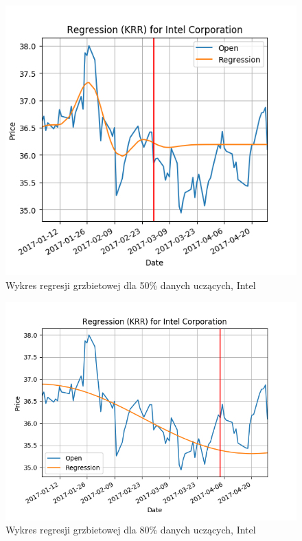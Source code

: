 \begin{figure}[h!]
\centering
\includegraphics[width=150mm]{pictures/plots/intel_krr_50.png}
\caption{Wykres regresji grzbietowej dla 50\% danych uczących, Intel}
\label{fig:Wykres regresji grzbietowej dla 50\% danych uczących, Intel}
\end{figure}

\begin{figure}[h!]
\centering
\includegraphics[width=150mm]{pictures/plots/intel_krr_80.png}
\caption{Wykres regresji grzbietowej dla 80\% danych uczących, Intel}
\label{fig:Wykres regresji grzbietowej dla 80\% danych uczących, Intel}
\end{figure}

